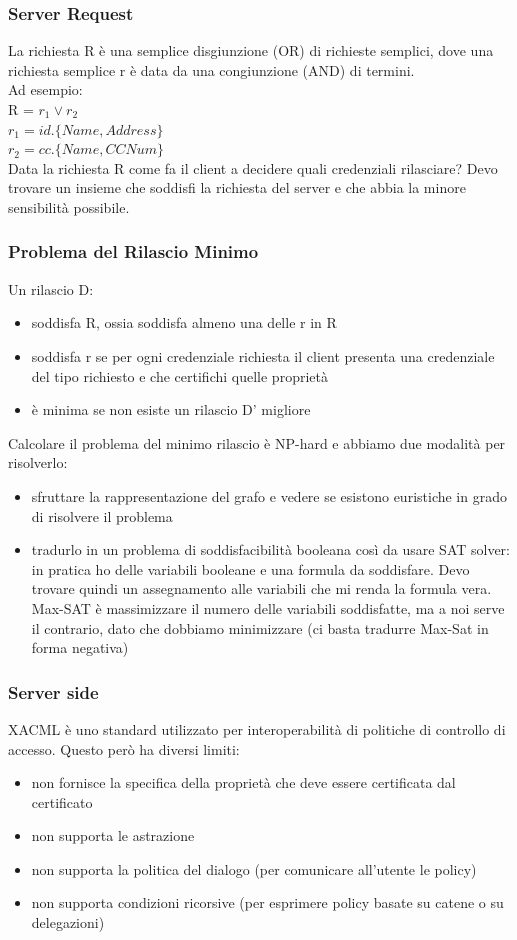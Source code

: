 \subsubsection{Server Request}
La richiesta R è una semplice disgiunzione (OR) di richieste semplici, dove una richiesta semplice r è data da una congiunzione (AND) di termini. \\
Ad esempio:\\
R = \( r_1 \lor r_2\) \\
\( r_1 = id.\{Name, Address\}\) \\
\( r_2 = cc.\{Name, CCNum\}\) \\
Data la richiesta R come fa il client a decidere quali credenziali rilasciare? Devo trovare un insieme che soddisfi la richiesta del server e che abbia la minore sensibilità possibile.

\subsubsection{Problema del Rilascio Minimo}
Un rilascio D:
\begin{itemize}
    \item soddisfa R, ossia soddisfa almeno una delle r in R
    \item soddisfa r se per ogni credenziale richiesta il client presenta una credenziale del tipo richiesto e che certifichi quelle proprietà
    \item è minima se non esiste un rilascio D' migliore
\end{itemize}
Calcolare il problema del minimo rilascio è NP-hard e abbiamo due modalità per risolverlo:
\begin{itemize}
    \item sfruttare la rappresentazione del grafo e vedere se esistono euristiche in grado di risolvere il problema
    \item tradurlo in un problema di soddisfacibilità booleana così da usare SAT solver: in pratica ho delle variabili booleane e una  formula da soddisfare. Devo trovare quindi un assegnamento alle variabili che mi renda la formula vera. Max-SAT è massimizzare il numero delle variabili soddisfatte, ma a noi serve il contrario, dato che dobbiamo minimizzare (ci basta tradurre Max-Sat in forma negativa)
\end{itemize}

\subsubsection{Server side}
XACML è uno standard utilizzato per interoperabilità di politiche di controllo di accesso. Questo però ha diversi limiti:
\begin{itemize}
    \item non fornisce la specifica della proprietà che deve essere certificata dal certificato
    \item non supporta le astrazione
    \item non supporta la politica del dialogo (per comunicare all'utente le policy)
    \item non supporta condizioni ricorsive (per esprimere policy basate su catene o su delegazioni)
\end{itemize}